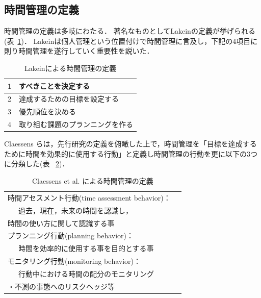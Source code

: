 \documentclass[submit,techrep,noauthor]{ipsj}
\begin{document}
\subsection{時間管理の定義}
時間管理の定義は多岐にわたる．
著名なものとしてLakeinの定義\cite{Lakein1989}が挙げられる(表~\ref{tb:Lakein})．
Lakeinは個人管理という位置付けで時間管理に言及し，下記の4項目に則り時間管理を遂行していく重要性を説いた．

\begin{table}[htb]
\begin{center}
  \caption{Lakeinによる時間管理の定義}
  \begin{tabular}{|l|l|} \hline
   1 & すべきことを決定する \\ \hline
   2 & 達成するための目標を設定する \\ \hline
   3 & 優先順位を決める \\ \hline
   4 & 取り組む課題のプランニングを作る \\ \hline
  \end{tabular}
  \label{tb:Lakein}
\end{center}
\end{table}

Claessens らは，先行研究の定義を俯瞰した上で，時間管理を「目標を達成するために時間を効果的に使用する行動」と定義し時間管理の行動を更に以下の3つに分類した\cite{Claessens2007}(表 ~\ref{tb:Claessens})．


\begin{table}[htb]
\begin{center}
  \caption{Claessens et al. による時間管理の定義}
  \begin{tabular}{|l|l|} \hline
   時間アセスメント行動(time assessment behavior)： \\ ~~~過去，現在，未来の時間を認識し，\\時間の使い方に関して認識する事 \\ \hline
   プランニング行動(planning behavior)：　\\  ~~~時間を効率的に使用する事を目的とする事 \\ \hline
   モニタリング行動(monitoring behavior)： \\ ~~~行動中における時間の配分のモニタリング\\・不測の事態へのリスクヘッジ等 \\ \hline
  \end{tabular}
  \label{tb:Claessens}
\end{center}
\end{table}
\end{document}
